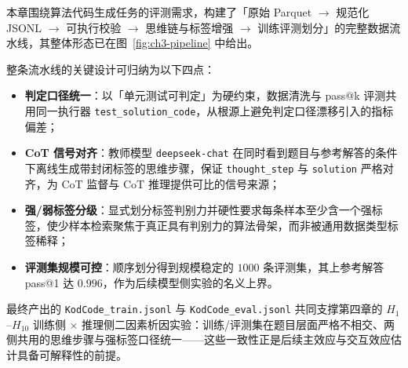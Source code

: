 
本章围绕算法代码生成任务的评测需求，构建了「原始 Parquet $\to$ 规范化 JSONL $\to$ 可执行校验 $\to$ 思维链与标签增强 $\to$ 训练评测划分」的完整数据流水线，其整体形态已在图~\ref{fig:ch3-pipeline} 中给出。

整条流水线的关键设计可归纳为以下四点：
\begin{itemize}
    \item \textbf{判定口径统一}：以「单元测试可判定」为硬约束，数据清洗与 pass@k 评测共用同一执行器 \texttt{test\_solution\_code}，从根源上避免判定口径漂移引入的指标偏差；
    \item \textbf{CoT 信号对齐}：教师模型 \texttt{deepseek-chat} 在同时看到题目与参考解答的条件下离线生成带封闭标签的思维步骤，保证 \texttt{thought\_step} 与 \texttt{solution} 严格对齐，为 CoT 监督与 CoT 推理提供可比的信号来源；
    \item \textbf{强/弱标签分级}：显式划分标签判别力并硬性要求每条样本至少含一个强标签，使少样本检索聚焦于真正具有判别力的算法骨架，而非被通用数据类型标签稀释；
    \item \textbf{评测集规模可控}：顺序划分得到规模稳定的 $1000$ 条评测集，其上参考解答 pass@1 达 $0.996$，作为后续模型侧实验的名义上界。
\end{itemize}

最终产出的 \texttt{KodCode\_train.jsonl} 与 \texttt{KodCode\_eval.jsonl} 共同支撑第四章的 $H_1$--$H_{10}$ 训练侧 $\times$ 推理侧二因素析因实验：训练/评测集在题目层面严格不相交、两侧共用的思维步骤与强标签口径统一——这些一致性正是后续主效应与交互效应估计具备可解释性的前提。